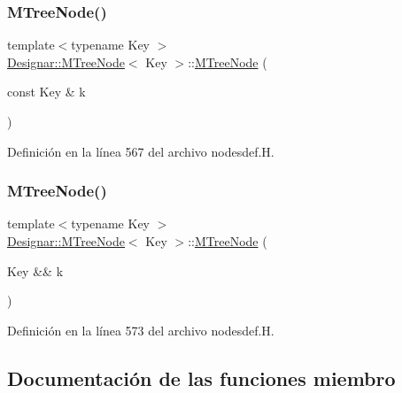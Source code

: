 \subsubsection{\texorpdfstring{M\+Tree\+Node()}{MTreeNode()}\hspace{0.1cm}{\footnotesize\ttfamily [2/3]}}
{\footnotesize\ttfamily template$<$typename Key $>$ \\
\hyperlink{class_designar_1_1_m_tree_node}{Designar\+::\+M\+Tree\+Node}$<$ Key $>$\+::\hyperlink{class_designar_1_1_m_tree_node}{M\+Tree\+Node} (\begin{DoxyParamCaption}\item[{const Key \&}]{k }\end{DoxyParamCaption})\hspace{0.3cm}{\ttfamily [inline]}}



Definición en la línea 567 del archivo nodesdef.\+H.

\mbox{\label{class_designar_1_1_m_tree_node_abee75a0ea8366fe1f815afddc4b18163}} 
\subsubsection{\texorpdfstring{M\+Tree\+Node()}{MTreeNode()}\hspace{0.1cm}{\footnotesize\ttfamily [3/3]}}
{\footnotesize\ttfamily template$<$typename Key $>$ \\
\hyperlink{class_designar_1_1_m_tree_node}{Designar\+::\+M\+Tree\+Node}$<$ Key $>$\+::\hyperlink{class_designar_1_1_m_tree_node}{M\+Tree\+Node} (\begin{DoxyParamCaption}\item[{Key \&\&}]{k }\end{DoxyParamCaption})\hspace{0.3cm}{\ttfamily [inline]}}



Definición en la línea 573 del archivo nodesdef.\+H.



\subsection{Documentación de las funciones miembro}
\mbox{\label{class_designar_1_1_m_tree_node_a393f9eb105d94c9a6cd13f09bead78aa}} 
